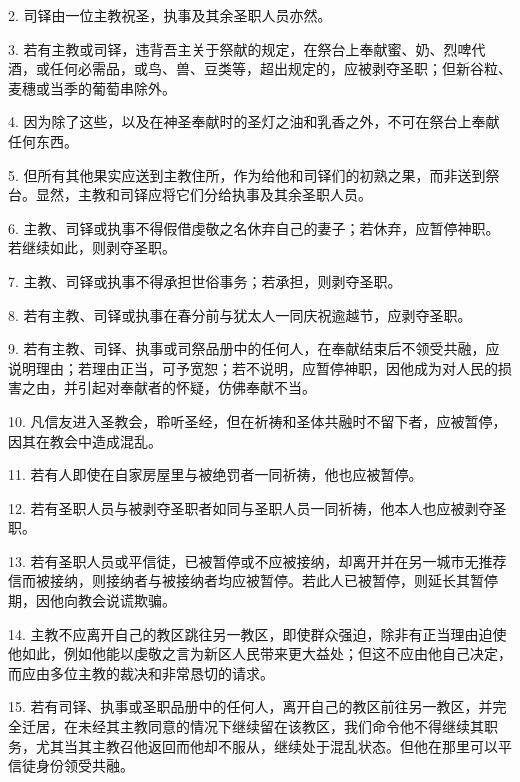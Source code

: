 2. 司铎由一位主教祝圣，执事及其余圣职人员亦然。\par

3. 若有主教或司铎，违背吾主关于祭献的规定，在祭台上奉献蜜、奶、烈啤代酒，或任何必需品，或鸟、兽、豆类等，超出规定的，应被剥夺圣职；但新谷粒、麦穗或当季的葡萄串除外。\par

4. 因为除了这些，以及在神圣奉献时的圣灯之油和乳香之外，不可在祭台上奉献任何东西。\par

5. 但所有其他果实应送到主教住所，作为给他和司铎们的初熟之果，而非送到祭台。显然，主教和司铎应将它们分给执事及其余圣职人员。\par

6. 主教、司铎或执事不得假借虔敬之名休弃自己的妻子；若休弃，应暂停神职。若继续如此，则剥夺圣职。\par

7. 主教、司铎或执事不得承担世俗事务；若承担，则剥夺圣职。\par

8. 若有主教、司铎或执事在春分前与犹太人一同庆祝逾越节，应剥夺圣职。\par

9. 若有主教、司铎、执事或司祭品册中的任何人，在奉献结束后不领受共融，应说明理由；若理由正当，可予宽恕；若不说明，应暂停神职，因他成为对人民的损害之由，并引起对奉献者的怀疑，仿佛奉献不当。\par

10. 凡信友进入圣教会，聆听圣经，但在祈祷和圣体共融时不留下者，应被暂停，因其在教会中造成混乱。\par

11. 若有人即使在自家房屋里与被绝罚者一同祈祷，他也应被暂停。\par

12. 若有圣职人员与被剥夺圣职者如同与圣职人员一同祈祷，他本人也应被剥夺圣职。\par

13. 若有圣职人员或平信徒，已被暂停或不应被接纳，却离开并在另一城市无推荐信而被接纳，则接纳者与被接纳者均应被暂停。若此人已被暂停，则延长其暂停期，因他向教会说谎欺骗。\par

14. 主教不应离开自己的教区跳往另一教区，即使群众强迫，除非有正当理由迫使他如此，例如他能以虔敬之言为新区人民带来更大益处；但这不应由他自己决定，而应由多位主教的裁决和非常恳切的请求。\par

15. 若有司铎、执事或圣职品册中的任何人，离开自己的教区前往另一教区，并完全迁居，在未经其主教同意的情况下继续留在该教区，我们命令他不得继续其职务，尤其当其主教召他返回而他却不服从，继续处于混乱状态。但他在那里可以平信徒身份领受共融。\par

